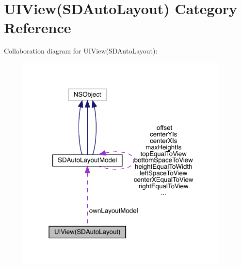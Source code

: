\hypertarget{category_u_i_view_07_s_d_auto_layout_08}{}\section{U\+I\+View(S\+D\+Auto\+Layout) Category Reference}
\label{category_u_i_view_07_s_d_auto_layout_08}


Collaboration diagram for U\+I\+View(S\+D\+Auto\+Layout)\+:\nopagebreak
\begin{figure}[H]
\begin{center}
\leavevmode
\includegraphics[width=303pt]{category_u_i_view_07_s_d_auto_layout_08__coll__graph}
\end{center}
\end{figure}
